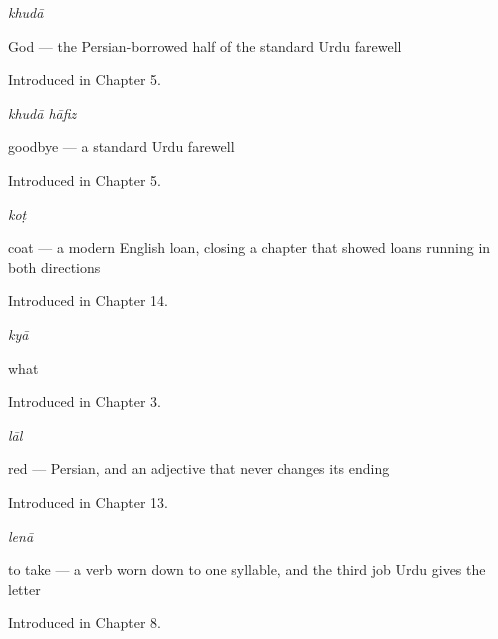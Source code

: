 \noindent\begin{minipage}[t]{\linewidth}
\raggedright
\textbf{}\enspace\emph{khudā}\par
\small God — the Persian-borrowed half of the standard Urdu farewell\par
\footnotesize Introduced in Chapter 5.
\end{minipage}\par\medskip

\noindent\begin{minipage}[t]{\linewidth}
\raggedright
\textbf{ }\enspace\emph{khudā hāfiz}\par
\small goodbye — a standard Urdu farewell\par
\footnotesize Introduced in Chapter 5.
\end{minipage}\par\medskip

\noindent\begin{minipage}[t]{\linewidth}
\raggedright
\textbf{}\enspace\emph{koṭ}\par
\small coat — a modern English loan, closing a chapter that showed loans running in both directions\par
\footnotesize Introduced in Chapter 14.
\end{minipage}\par\medskip

\noindent\begin{minipage}[t]{\linewidth}
\raggedright
\textbf{}\enspace\emph{kyā}\par
\small what\par
\footnotesize Introduced in Chapter 3.
\end{minipage}\par\medskip

\noindent\begin{minipage}[t]{\linewidth}
\raggedright
\textbf{}\enspace\emph{lāl}\par
\small red — Persian, and an adjective that never changes its ending\par
\footnotesize Introduced in Chapter 13.
\end{minipage}\par\medskip

\noindent\begin{minipage}[t]{\linewidth}
\raggedright
\textbf{}\enspace\emph{lenā}\par
\small to take — a verb worn down to one syllable, and the third job Urdu gives the letter \par
\footnotesize Introduced in Chapter 8.
\end{minipage}\par\medskip

